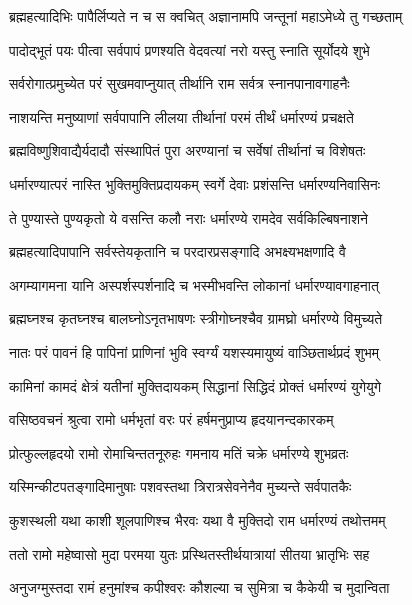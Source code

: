 \twolineshloka
{ब्रह्महत्यादिभिः पापैर्लिप्यते न च स क्वचित्}
{अज्ञानामपि जन्तूनां महाऽमेध्ये तु गच्छताम्}%

\twolineshloka
{पादोद्भूतं पयः पीत्वा सर्वपापं प्रणश्यति}
{वेदवत्यां नरो यस्तु स्नाति सूर्योदये शुभे}%

\twolineshloka
{सर्वरोगात्प्रमुच्येत परं सुखमवाप्नुयात्}
{तीर्थानि राम सर्वत्र स्नानपानावगाहनैः}%

\twolineshloka
{नाशयन्ति मनुष्याणां सर्वपापानि लीलया}
{तीर्थानां परमं तीर्थं धर्मारण्यं प्रचक्षते}%

\twolineshloka
{ब्रह्मविष्णुशिवाद्यैर्यदादौ संस्थापितं पुरा}
{अरण्यानां च सर्वेषां तीर्थानां च विशेषतः}%

\twolineshloka
{धर्मारण्यात्परं नास्ति भुक्तिमुक्तिप्रदायकम्}
{स्वर्गे देवाः प्रशंसन्ति धर्मारण्यनिवासिनः}%

\twolineshloka
{ते पुण्यास्ते पुण्यकृतो ये वसन्ति कलौ नराः}
{धर्मारण्ये रामदेव सर्वकिल्बिषनाशने}%

\twolineshloka
{ब्रह्महत्यादिपापानि सर्वस्तेयकृतानि च}
{परदारप्रसङ्गादि अभक्ष्यभक्षणादि वै}%

\twolineshloka
{अगम्यागमना यानि अस्पर्शस्पर्शनादि च}
{भस्मीभवन्ति लोकानां धर्मारण्यावगाहनात्}%

\twolineshloka
{ब्रह्मघ्नश्च कृतघ्नश्च बालघ्नोऽनृतभाषणः}
{स्त्रीगोघ्नश्चैव ग्रामघ्रो धर्मारण्ये विमुच्यते}%

\twolineshloka
{नातः परं पावनं हि पापिनां प्राणिनां भुवि}
{स्वर्ग्यं यशस्यमायुष्यं वाञ्छितार्थप्रदं शुभम्}%

\twolineshloka
{कामिनां कामदं क्षेत्रं यतीनां मुक्तिदायकम्}
{सिद्धानां सिद्धिदं प्रोक्तं धर्मारण्यं युगेयुगे}%


\twolineshloka
{वसिष्ठवचनं श्रुत्वा रामो धर्मभृतां वरः}
{परं हर्षमनुप्राप्य हृदयानन्दकारकम्}%

\twolineshloka
{प्रोत्फुल्लहृदयो रामो रोमाचिन्ततनूरुहः}
{गमनाय मतिं चक्रे धर्मारण्ये शुभव्रतः}%

\twolineshloka
{यस्मिन्कीटपतङ्गादिमानुषाः पशवस्तथा}
{त्रिरात्रसेवनेनैव मुच्यन्ते सर्वपातकैः}%

\twolineshloka
{कुशस्थली यथा काशी शूलपाणिश्च भैरवः}
{यथा वै मुक्तिदो राम धर्मारण्यं तथोत्तमम्}%

\twolineshloka
{ततो रामो महेष्वासो मुदा परमया युतः}
{प्रस्थितस्तीर्थयात्रायां सीतया भ्रातृभिः सह}%

\twolineshloka
{अनुजग्मुस्तदा रामं हनुमांश्च कपीश्वरः}
{कौशल्या च सुमित्रा च कैकेयी च मुदान्विता}%

